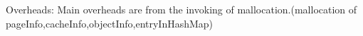 Overheads:
    Main overheads are from the invoking of mallocation.(mallocation of pageInfo,cacheInfo,objectInfo,entryInHashMap)